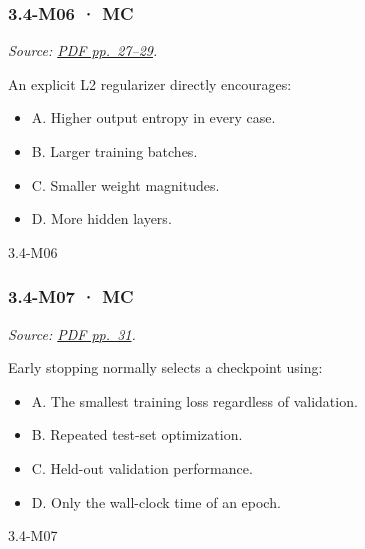 \noindent\begin{minipage}{\linewidth}

\subsubsection{3.4-M06 · MC}\label{m06-mc-10}

\emph{Source:
\href{../Lecture\%20Slides/3.4.\%20Deep\%20Learning\%20Fundamentals\%20II.pdf\#page=27}{PDF
pp.~27--29}.}

An explicit L2 regularizer directly encourages:

\begin{itemize}
\tightlist
\item
  A. Higher output entropy in every case.
\item
  B. Larger training batches.
\item
  C. Smaller weight magnitudes.
\item
  D. More hidden layers.
\end{itemize}

\begin{solution}[8mm]{3.4-M06}

\end{solution}
\end{minipage}\par\medskip

\noindent\begin{minipage}{\linewidth}

\subsubsection{3.4-M07 · MC}\label{m07-mc-10}

\emph{Source:
\href{../Lecture\%20Slides/3.4.\%20Deep\%20Learning\%20Fundamentals\%20II.pdf\#page=31}{PDF
pp.~31}.}

Early stopping normally selects a checkpoint using:

\begin{itemize}
\tightlist
\item
  A. The smallest training loss regardless of validation.
\item
  B. Repeated test-set optimization.
\item
  C. Held-out validation performance.
\item
  D. Only the wall-clock time of an epoch.
\end{itemize}

\begin{solution}[8mm]{3.4-M07}

\end{solution}
\end{minipage}\par\medskip

